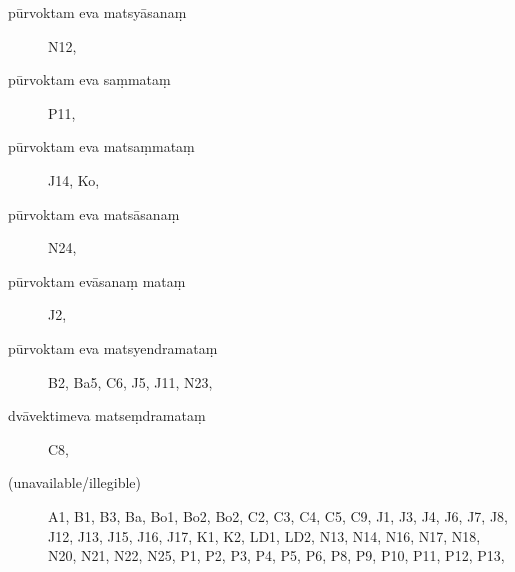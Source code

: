 \begin{ekdosis}
\begin{marma}[hp01_037]
   \begin{description}
\item[pūrvoktam eva matsyāsanaṃ] N12,
\item[pūrvoktam eva saṃmataṃ] P11,
\item[pūrvoktam eva matsaṃmataṃ] J14, Ko,
\item[pūrvoktam eva matsāsanaṃ] N24,
\item[pūrvoktam evāsanaṃ mataṃ] J2,
\item[pūrvoktam eva matsyendramataṃ] B2, Ba5, C6, J5, J11, N23,
\item[dvāvektimeva matseṃdramataṃ] C8, 
\item[(unavailable/illegible)]  A1, B1, B3, Ba, Bo1, Bo2, Bo2, C2, C3, C4, C5, C9, J1, J3, J4, J6, J7, J8, J12, J13, J15, J16, J17, K1, K2, LD1, LD2, N13, N14, N16, N17, N18, N20, N21, N22, N25, P1, P2, P3, P4, P5, P6, P8, P9, P10, P11, P12, P13, 
\end{description}
 \end{marma}


    


\end{ekdosis}
